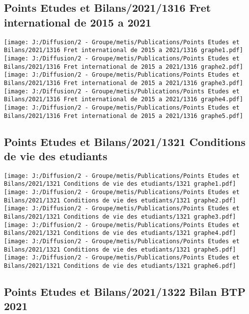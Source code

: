 \documentclass[
]{article}
\begin{document}
\hypertarget{points-etudes-et-bilans20211316-fret-international-de-2015-a-2021}{%
\subsection{Points Etudes et Bilans/2021/1316 Fret international de 2015
a
2021}\label{points-etudes-et-bilans20211316-fret-international-de-2015-a-2021}}

\texttt{[image: J:/Diffusion/2 - Groupe/metis/Publications/Points Etudes et Bilans/2021/1316 Fret international de 2015 a 2021/1316 graphe1.pdf]}
\texttt{[image: J:/Diffusion/2 - Groupe/metis/Publications/Points Etudes et Bilans/2021/1316 Fret international de 2015 a 2021/1316 graphe2.pdf]}
\texttt{[image: J:/Diffusion/2 - Groupe/metis/Publications/Points Etudes et Bilans/2021/1316 Fret international de 2015 a 2021/1316 graphe3.pdf]}
\texttt{[image: J:/Diffusion/2 - Groupe/metis/Publications/Points Etudes et Bilans/2021/1316 Fret international de 2015 a 2021/1316 graphe4.pdf]}
\texttt{[image: J:/Diffusion/2 - Groupe/metis/Publications/Points Etudes et Bilans/2021/1316 Fret international de 2015 a 2021/1316 graphe5.pdf]}

\hypertarget{points-etudes-et-bilans20211321-conditions-de-vie-des-etudiants}{%
\subsection{Points Etudes et Bilans/2021/1321 Conditions de vie des
etudiants}\label{points-etudes-et-bilans20211321-conditions-de-vie-des-etudiants}}

\texttt{[image: J:/Diffusion/2 - Groupe/metis/Publications/Points Etudes et Bilans/2021/1321 Conditions de vie des etudiants/1321 graphe1.pdf]}
\texttt{[image: J:/Diffusion/2 - Groupe/metis/Publications/Points Etudes et Bilans/2021/1321 Conditions de vie des etudiants/1321 graphe2.pdf]}
\texttt{[image: J:/Diffusion/2 - Groupe/metis/Publications/Points Etudes et Bilans/2021/1321 Conditions de vie des etudiants/1321 graphe3.pdf]}
\texttt{[image: J:/Diffusion/2 - Groupe/metis/Publications/Points Etudes et Bilans/2021/1321 Conditions de vie des etudiants/1321 graphe4.pdf]}
\texttt{[image: J:/Diffusion/2 - Groupe/metis/Publications/Points Etudes et Bilans/2021/1321 Conditions de vie des etudiants/1321 graphe5.pdf]}
\texttt{[image: J:/Diffusion/2 - Groupe/metis/Publications/Points Etudes et Bilans/2021/1321 Conditions de vie des etudiants/1321 graphe6.pdf]}

\hypertarget{points-etudes-et-bilans20211322-bilan-btp-2021}{%
\subsection{Points Etudes et Bilans/2021/1322 Bilan BTP
2021}\label{points-etudes-et-bilans20211322-bilan-btp-2021}}
\end{document}
